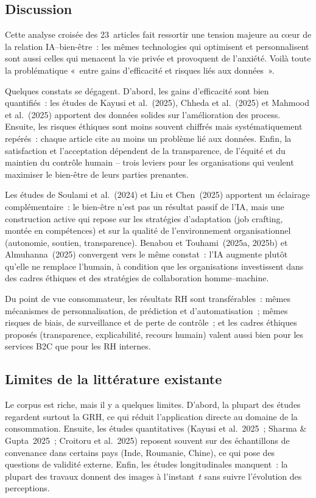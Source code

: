 \documentclass[12pt,a4paper]{article}
\begin{document}
\subsection{Discussion}

Cette analyse croisée des 23~articles fait ressortir une tension majeure au cœur de la
relation IA--bien-être~: les mêmes technologies qui optimisent et personnalisent sont aussi
celles qui menacent la vie privée et provoquent de l'anxiété. Voilà toute la problématique
«~entre gains d'efficacité et risques liés aux données~».

Quelques constats se dégagent. D'abord, les gains d'efficacité sont bien quantifiés~: les
études de Kayusi et al.~(2025), Chheda et al.~(2025) et Mahmood et al.~(2025) apportent
des données solides sur l'amélioration des process. Ensuite, les risques éthiques sont moins
souvent chiffrés mais systématiquement repérés~: chaque article cite au moins un problème
lié aux données. Enfin, la satisfaction et l'acceptation dépendent de la transparence, de
l'équité et du maintien du contrôle humain -- trois leviers pour les organisations qui
veulent maximiser le bien-être de leurs parties prenantes.

Les études de Soulami et al.~(2024) et Liu et Chen~(2025) apportent un éclairage
complémentaire~: le bien-être n'est pas un résultat passif de l'IA, mais une construction
active qui repose sur les stratégies d'adaptation (job crafting, montée en compétences) et
sur la qualité de l'environnement organisationnel (autonomie, soutien, transparence).
Benabou et Touhami~(2025a, 2025b) et Almuhanna~(2025) convergent vers le même
constat~: l'IA augmente plutôt qu'elle ne remplace l'humain, à condition que les
organisations investissent dans des cadres éthiques et des stratégies de collaboration
homme--machine.

Du point de vue consommateur, les résultats RH sont transférables~: mêmes mécanismes
de personnalisation, de prédiction et d'automatisation~; mêmes risques de biais, de
surveillance et de perte de contrôle~; et les cadres éthiques proposés (transparence,
explicabilité, recours humain) valent aussi bien pour les services B2C que pour les RH
internes.

\subsection{Limites de la littérature existante}

Le corpus est riche, mais il y a quelques limites. D'abord, la plupart des études regardent
surtout la GRH, ce qui réduit l'application directe au domaine de la consommation. Ensuite,
les études quantitatives (Kayusi et al.~2025~; Sharma \& Gupta~2025~; Croitoru et al.~2025)
reposent souvent sur des échantillons de convenance dans certains pays (Inde, Roumanie,
Chine), ce qui pose des questions de validité externe. Enfin, les études longitudinales
manquent~: la plupart des travaux donnent des images à l'instant~$t$ sans suivre l'évolution
des perceptions.
\end{document}
